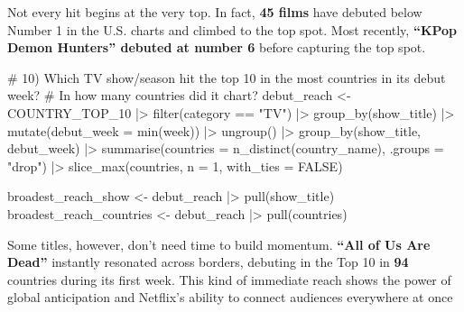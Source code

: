 \documentclass[
  12pt,
  letterpaper,
  DIV=11,
  numbers=noendperiod]{scrartcl}
\newenvironment{Shaded}{\begin{snugshade}}{\end{snugshade}}
\newcommand{\AttributeTok}[1]{\textcolor[rgb]{0.40,0.45,0.13}{#1}}
\newcommand{\CommentTok}[1]{\textcolor[rgb]{0.37,0.37,0.37}{#1}}
\newcommand{\ConstantTok}[1]{\textcolor[rgb]{0.56,0.35,0.01}{#1}}
\newcommand{\DecValTok}[1]{\textcolor[rgb]{0.68,0.00,0.00}{#1}}
\newcommand{\FunctionTok}[1]{\textcolor[rgb]{0.28,0.35,0.67}{#1}}
\newcommand{\NormalTok}[1]{\textcolor[rgb]{0.00,0.23,0.31}{#1}}
\newcommand{\OtherTok}[1]{\textcolor[rgb]{0.00,0.23,0.31}{#1}}
\newcommand{\SpecialCharTok}[1]{\textcolor[rgb]{0.37,0.37,0.37}{#1}}
\newcommand{\StringTok}[1]{\textcolor[rgb]{0.13,0.47,0.30}{#1}}
\begin{document}
Not every hit begins at the very top. In fact, \textbf{45 films} have
debuted below Number 1 in the U.S. charts and climbed to the top spot.
Most recently, \textbf{``KPop Demon Hunters'' debuted at number 6}
before capturing the top spot.

\begin{Shaded}
\begin{Highlighting}[]
\CommentTok{\# 10) Which TV show/season hit the top 10 in the most countries in its debut week? }
\CommentTok{\# In how many countries did it chart?}
\NormalTok{debut\_reach }\OtherTok{\textless{}{-}}\NormalTok{ COUNTRY\_TOP\_10 }\SpecialCharTok{|\textgreater{}} 
  \FunctionTok{filter}\NormalTok{(category }\SpecialCharTok{==} \StringTok{"TV"}\NormalTok{) }\SpecialCharTok{|\textgreater{}}
  \FunctionTok{group\_by}\NormalTok{(show\_title) }\SpecialCharTok{|\textgreater{}} 
  \FunctionTok{mutate}\NormalTok{(}\AttributeTok{debut\_week =} \FunctionTok{min}\NormalTok{(week)) }\SpecialCharTok{|\textgreater{}}
  \FunctionTok{ungroup}\NormalTok{() }\SpecialCharTok{|\textgreater{}} 
  \FunctionTok{group\_by}\NormalTok{(show\_title, debut\_week) }\SpecialCharTok{|\textgreater{}} 
  \FunctionTok{summarise}\NormalTok{(}\AttributeTok{countries =} \FunctionTok{n\_distinct}\NormalTok{(country\_name), }\AttributeTok{.groups =} \StringTok{"drop"}\NormalTok{) }\SpecialCharTok{|\textgreater{}} 
  \FunctionTok{slice\_max}\NormalTok{(countries, }\AttributeTok{n =} \DecValTok{1}\NormalTok{, }\AttributeTok{with\_ties =} \ConstantTok{FALSE}\NormalTok{)}

\NormalTok{broadest\_reach\_show }\OtherTok{\textless{}{-}}\NormalTok{ debut\_reach }\SpecialCharTok{|\textgreater{}} \FunctionTok{pull}\NormalTok{(show\_title)}
\NormalTok{broadest\_reach\_countries }\OtherTok{\textless{}{-}}\NormalTok{ debut\_reach }\SpecialCharTok{|\textgreater{}} \FunctionTok{pull}\NormalTok{(countries)}
\end{Highlighting}
\end{Shaded}

Some titles, however, don't need time to build momentum. \textbf{``All
of Us Are Dead''} instantly resonated across borders, debuting in the
Top 10 in \textbf{94} countries during its first week. This kind of
immediate reach shows the power of global anticipation and Netflix's
ability to connect audiences everywhere at once
\end{document}
